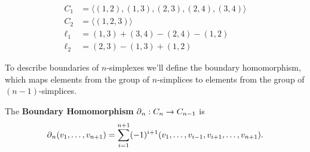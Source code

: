 \begin{figure}
    \centering
    \begin{minipage}{.5\textwidth}
        \centering
        
    \end{minipage}%
    \begin{minipage}{.5\textwidth}
        \begin{align*}
            C_1 &= \langle (1,2),(1,3),(2,3),(2,4),(3,4) \rangle \\
            C_2 &= \langle (1,2,3) \rangle \\
            \ell_1 &= (1,3) + (3,4) - (2,4) - (1,2)\\
            \ell_2 &= (2,3) - (1,3) + (1,2)
        \end{align*}
    \end{minipage}
    \caption{}
    \label{fig:example-cech}
\end{figure}

To describe boundaries of \(n\)-simplexes we'll define the boundary homomorphism, which maps elements from the group of \(n\)-simplices to elements from the group of \((n-1)\)-simplices.

\begin{definition}
    The \textbf{Boundary Homomorphism} \(\operatorname{\partial}_n : C_n \to C_{n-1}\) is
    \[
        \operatorname{\partial}_n (v_1,\dots , v_{n+1}) = \sum_{i=1}^{n+1} (-1)^{i+1}
        (v_1,\dots, v_{i-1}, v_{i+1}, \dots, v_{n+1})
        .
    \]
    \cite{hatcher}
\end{definition}

